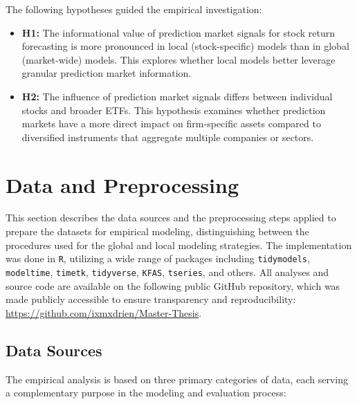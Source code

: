\documentclass[12pt]{report}
\begin{document}
The following hypotheses guided the empirical investigation:
\begin{itemize}
    \item \textbf{H1:} The informational value of prediction market signals for stock return forecasting is more pronounced in local (stock-specific) models than in global (market-wide) models. This explores whether local models better leverage granular prediction market information.


    \item \textbf{H2:} The influence of prediction market signals differs between individual stocks and broader ETFs. This hypothesis examines whether prediction markets have a more direct impact on firm-specific assets compared to diversified instruments that aggregate multiple companies or sectors.

\end{itemize}

\newpage
\section{Data and Preprocessing}

This section describes the data sources and the preprocessing steps applied to prepare the datasets for empirical modeling, distinguishing between the procedures used for the global and local modeling strategies. The implementation was done in \texttt{R}, utilizing a wide range of packages including \texttt{tidymodels}, \texttt{modeltime}, \texttt{timetk}, \texttt{tidyverse}, \texttt{KFAS}, \texttt{tseries}, and others. All analyses and source code are available on the following public GitHub repository, which was made publicly accessible to ensure transparency and reproducibility: \url{https://github.com/ixmxdrien/Master-Thesis}.

\subsection{Data Sources}
The empirical analysis is based on three primary categories of data, each serving a complementary purpose in the modeling and evaluation process:
\end{document}
